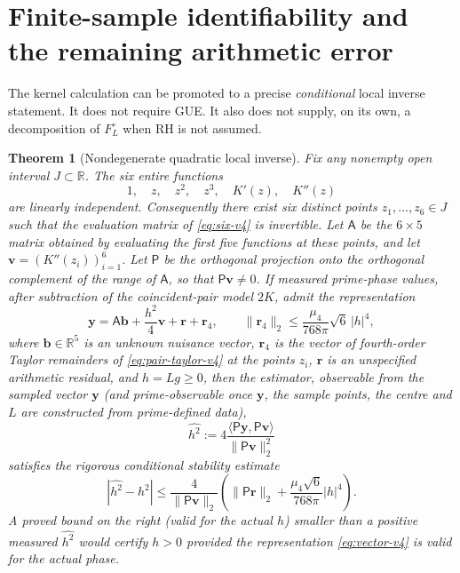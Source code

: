 \documentclass[11pt,a4paper]{article}
\numberwithin{equation}{section}
\newtheorem{theorem}{Theorem}[section]
\theoremstyle{definition}
\theoremstyle{remark}
\begin{document}
\section{Finite-sample identifiability and the remaining arithmetic error}
\label{sec:identify-v4}
The kernel calculation can be promoted to a precise \emph{conditional}
local inverse statement. It does not require GUE. It also does not
supply, on its own, a decomposition of $F_L^\circ$ when RH is not
assumed.
\begin{theorem}[Nondegenerate quadratic local inverse]
\label{thm:identifiability-v4}
Fix any nonempty open interval $J\subset\mathbb R$. The six entire
functions
\begin{equation}\label{eq:six-v4}
 1,\quad z,\quad z^2,\quad z^3,\quad K'(z),\quad K''(z)
\end{equation}
are linearly independent. Consequently there exist six distinct
points $z_1,\dots,z_6\in J$ such that the evaluation matrix of
\eqref{eq:six-v4} is invertible.
Let $\mathsf A$ be the $6\times5$ matrix obtained by evaluating
the first five functions at these points, and let
$\mathbf v=(K''(z_i))_{i=1}^6$. Let $\mathsf P$ be the orthogonal
projection onto the orthogonal complement of the range of
$\mathsf A$, so that $\mathsf P\mathbf v\ne0$.
If measured prime-phase values, after subtraction of the
coincident-pair model $2K$, admit the representation
\begin{equation}\label{eq:vector-v4}
 \mathbf y=\mathsf A\mathbf b+\frac{h^2}{4}\mathbf v
   +\mathbf r+\mathbf r_4,
 \qquad\|\mathbf r_4\|_2\le
 \frac{\mu_4}{768\pi}\sqrt6\,|h|^4,
\end{equation}
where $\mathbf b\in\mathbb R^5$ is an unknown nuisance vector,
$\mathbf r_4$ is the vector of fourth-order Taylor remainders of \eqref{eq:pair-taylor-v4} at the points $z_i$,
$\mathbf r$ is an unspecified arithmetic residual, and $h=Lg\ge0$,
then the estimator, observable from the sampled vector $\mathbf y$
(and prime-observable once $\mathbf y$, the sample points, the centre and
$L$ are constructed from prime-defined data),
\begin{equation}\label{eq:estimator-v4}
 \widehat{h^2}:=4\frac{\langle\mathsf P\mathbf y,
 \mathsf P\mathbf v\rangle}{\|\mathsf P\mathbf v\|_2^2}
\end{equation}
satisfies the rigorous conditional stability estimate
\begin{equation}\label{eq:estimate-error-v4}
 \boxed{\quad
 |\widehat{h^2}-h^2|\le
 \frac{4}{\|\mathsf P\mathbf v\|_2}
 \left(\|\mathsf P\mathbf r\|_2+
 \frac{\mu_4\sqrt6}{768\pi}|h|^4\right).\quad}
\end{equation}
A proved bound on the right (valid for the actual $h$) smaller than a \emph{positive measured}
$\widehat{h^2}$ would certify $h>0$ \emph{provided} the
representation \eqref{eq:vector-v4} is valid for the actual phase.
\end{theorem}
\end{document}
